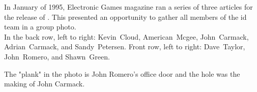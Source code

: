 \par
{}
\par





\begin{figure}
\end{figure}

In January of 1995, Electronic Games magazine ran a series of three articles for the release of \doomii{}. This presented an opportunity to gather all members of the id team in a group photo.\\
 In the back row, left to right: Kevin~Cloud, American~Mcgee, John~Carmack, Adrian~Carmack, and Sandy~Petersen. Front row, left to right: Dave~Taylor, John~Romero, and Shawn~Green.\\
 \par The "plank" in the photo is John Romero's office door and the hole was the making of John Carmack.\\
  \par
{}






